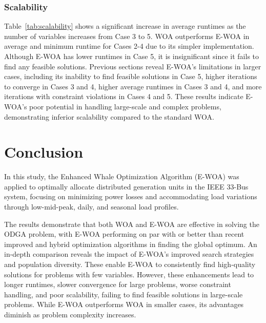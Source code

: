 \documentclass[conference]{IEEEtran}
\begin{document}
\subsubsection{Scalability}
Table~\ref{tab:scalability} shows a significant increase in average runtimes as the number of variables increases from Case 3 to 5. WOA outperforms E-WOA in average and minimum runtime for Cases 2-4 due to its simpler implementation. Although E-WOA has lower runtimes in Case 5, it is insignificant since it fails to find any feasible solutions. Previous sections reveal E-WOA's limitations in larger cases, including its inability to find feasible solutions in Case 5, higher iterations to converge in Cases 3 and 4, higher average runtimes in Cases 3 and 4, and more iterations with constraint violations in Cases 4 and 5. These results indicate E-WOA's poor potential in handling large-scale and complex problems, demonstrating inferior scalability compared to the standard WOA.

\vspace{-4pt}



\section{Conclusion}\label{sec:conclusion}
In this study, the Enhanced Whale Optimization Algorithm (E-WOA) was applied to optimally allocate distributed generation units in the IEEE 33-Bus system, focusing on minimizing power losses and accommodating  load variations through low-mid-peak, daily, and seasonal load profiles.

The results demonstrate that both WOA and E-WOA are effective in solving the ODGA problem, with E-WOA performing on par with or better than recent improved and hybrid optimization algorithms in finding the global optimum. An in-depth comparison reveals the impact of E-WOA's improved search strategies and population diversity. These enable E-WOA to consistently find high-quality solutions for problems with few variables. However, these enhancements lead to longer runtimes, slower convergence for large problems, worse constraint handling, and poor scalability, failing to find feasible solutions in large-scale problems. While E-WOA outperforms WOA in smaller cases, its advantages diminish as problem complexity increases.
\end{document}
